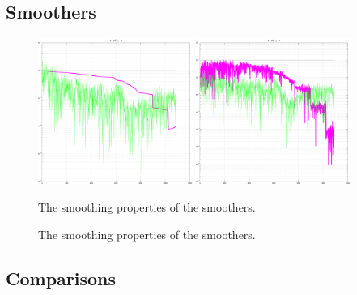 \subsection{Smoothers}

\begin{figure}
	\includegraphics[width=0.45\textwidth]{figs/smoothers-order4}
	\includegraphics[width=0.45\textwidth]{figs/vcycle-order4}
	\caption{\label{fig:smoothers} The smoothing properties of the smoothers.}
\end{figure}

\begin{figure}
	
	\caption{\label{fig:smoothers2} The smoothing properties of the smoothers.}
\end{figure}

\subsection{Comparisons}

